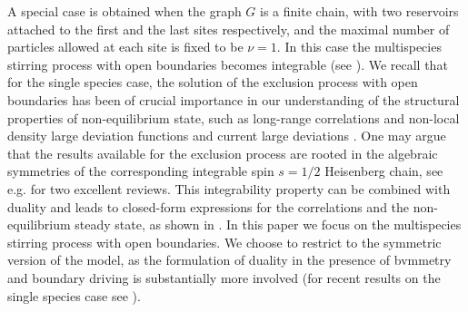 \documentclass[10pt]{article}
\numberwithin{equation}{section}
\numberwithin{equation}{subsection}
\begin{document}
A special case is obtained when the graph $G$ is a finite chain, 
with two reservoirs attached to the first and the last sites respectively, 
and the maximal number of particles allowed at each site is fixed to be $\nu=1$.
In this case the multispecies stirring process with open boundaries 
becomes integrable (see \cite{vanicat2017exact}). 
We recall that for the single species case,  the solution of the exclusion process with open boundaries \cite{derrida1993exact,1993JSP....72..277S} has been of crucial importance in our understanding of the structural properties of non-equilibrium state, such as long-range correlations \cite{spohn1983long} and non-local density large deviation functions \cite{derrida2007non,derrida1998exact} and current large deviations \cite{mallick2022exact,bodineau2005current}. One may argue that the results available for the exclusion process are rooted in the algebraic symmetries of the corresponding integrable spin $s=1/2$ Heisenberg chain, see e.g. \cite{schutzManyBody,SSEPReviewRagoucy} for two excellent reviews.
This integrability property can be combined with duality and leads to closed-form expressions for the correlations and the non-equilibrium steady state, as shown in \cite{frassek2020eigenstates,frassek2020duality}.
In this paper we focus on the multispecies stirring process with open boundaries.
We choose to restrict to the symmetric version of the model, as the formulation
of duality in the presence of bvmmetry and boundary driving is substantially
more involved (for recent results on the single species case see
\cite{schuetz2022reverse,barraquand2022markov}).


 

 




 
\end{document}
